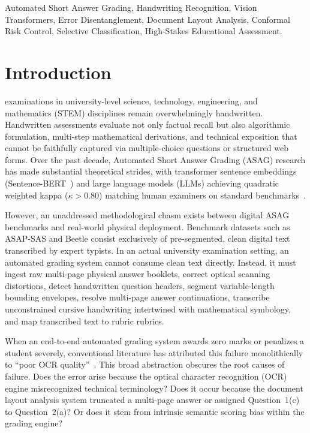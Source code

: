 \documentclass[journal]{IEEEtran}
\begin{document}
\begin{IEEEkeywords}
Automated Short Answer Grading, Handwriting Recognition, Vision Transformers, Error Disentanglement, Document Layout Analysis, Conformal Risk Control, Selective Classification, High-Stakes Educational Assessment.
\end{IEEEkeywords}

\section{Introduction}
 examinations in university-level science, technology, engineering, and mathematics (STEM) disciplines remain overwhelmingly handwritten. Handwritten assessments evaluate not only factual recall but also algorithmic formulation, multi-step mathematical derivations, and technical exposition that cannot be faithfully captured via multiple-choice questions or structured web forms. Over the past decade, Automated Short Answer Grading (ASAG) research has made substantial theoretical strides, with transformer sentence embeddings (Sentence-BERT~\cite{reimers2019sentencebert}) and large language models (LLMs) achieving quadratic weighted kappa ($\kappa > 0.80$) matching human examiners on standard benchmarks~\cite{burrows2015erasag, meurers2011short}.

However, an unaddressed methodological chasm exists between digital ASAG benchmarks and real-world physical deployment. Benchmark datasets such as ASAP-SAS and Beetle consist exclusively of pre-segmented, clean digital text transcribed by expert typists. In an actual university examination setting, an automated grading system cannot consume clean text directly. Instead, it must ingest raw multi-page physical answer booklets, correct optical scanning distortions, detect handwritten question headers, segment variable-length bounding envelopes, resolve multi-page answer continuations, transcribe unconstrained cursive handwriting intertwined with mathematical symbology, and map transcribed text to rubric rubrics.

When an end-to-end automated grading system awards zero marks or penalizes a student severely, conventional literature has attributed this failure monolithically to ``poor OCR quality''~\cite{burrows2015erasag}. This broad abstraction obscures the root causes of failure. Does the error arise because the optical character recognition (OCR) engine misrecognized technical terminology? Does it occur because the document layout analysis system truncated a multi-page answer or assigned Question~1(c) to Question~2(a)? Or does it stem from intrinsic semantic scoring bias within the grading engine?
\end{document}
